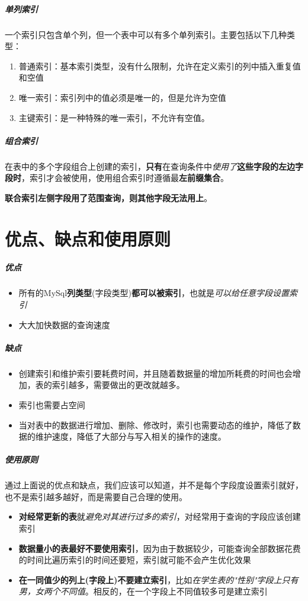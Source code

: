 \documentclass[UTF8,a4paper,12pt]{ctexbook}
\begin{document}
		\subparagraph{单列索引}
			一个索引只包含单个列，但一个表中可以有多个单列索引。主要包括以下几种类型：
			\begin{enumerate}[itemindent = 2em]
				\item 普通索引：基本索引类型，没有什么限制，允许在定义索引的列中插入重复值和空值
				\item 唯一索引：索引列中的值必须是唯一的，但是允许为空值
				\item 主键索引：是一种特殊的唯一索引，不允许有空值。
			\end{enumerate}
			
		\subparagraph{组合索引}
			在表中的多个字段组合上创建的索引，\textbf{只有}在查询条件中\textit{使用了}\textbf{这些字段的左边字段时}，索引才会被使用，使用组合索引时遵循最\textbf{左前缀集合}。
		
			\textbf{联合索引左侧字段用了范围查询，则其他字段无法用上}。
			
		
		
			
	\section{优点、缺点和使用原则}
		\subparagraph{优点}
			\begin{itemize}[itemindent = 1em]
				\item 所有的MySql\textbf{列类型}(字段类型)\textbf{都可以被索引}，也就是\textit{可以给任意字段设置索引}
				\item 大大加快数据的查询速度
			\end{itemize}
			
		\subparagraph{缺点}
			\begin{itemize}[itemindent = 1em]
				\item 创建索引和维护索引要耗费时间，并且随着数据量的增加所耗费的时间也会增加，表的索引越多，需要做出的更改就越多。
				\item 索引也需要占空间
				\item 当对表中的数据进行增加、删除、修改时，索引也需要动态的维护，降低了数据的维护速度，降低了大部分与写入相关的操作的速度。
			\end{itemize}
			
		\subparagraph{使用原则}
			通过上面说的优点和缺点，我们应该可以知道，并不是每个字段度设置索引就好，也不是索引越多越好，而是需要自己合理的使用。
			\begin{itemize}[itemindent = 1em]
				\item \textbf{对经常更新的表}就\textit{避免对其进行过多的索引}，对经常用于查询的字段应该创建索引
				\item \textbf{数据量小的表最好不要使用索引}，因为由于数据较少，可能查询全部数据花费的时间比遍历索引的时间还要短，索引就可能不会产生优化效果
				\item \textbf{在一同值少的列上(字段上)不要建立索引}，比如\textit{在学生表的"性别"字段上只有男，女两个不同值}。相反的，在一个字段上不同值较多可是建立索引
			\end{itemize}
	
\end{document}
